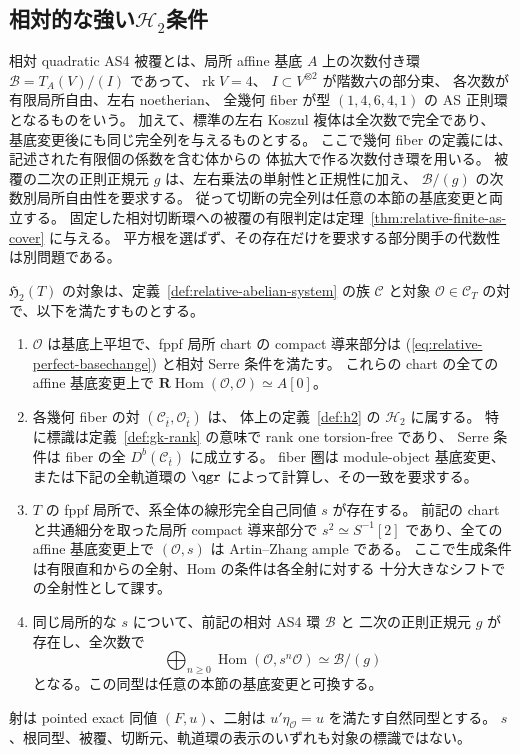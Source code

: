\subsection{相対的な強い\texorpdfstring{$\mathcal H_2$}{H2}条件}

相対 quadratic AS4 被覆とは、局所 affine 基底 $A$ 上の次数付き環
$\mathcal B=T_A(V)/(I)$ であって、$\operatorname{rk}V=4$、
$I\subset V^{\otimes2}$ が階数六の部分束、
各次数が有限局所自由、左右 noetherian、
全幾何 fiber が型 $(1,4,6,4,1)$ の AS 正則環となるものをいう。
加えて、標準の左右 Koszul 複体は全次数で完全であり、
基底変更後にも同じ完全列を与えるものとする。
ここで幾何 fiber の定義には、記述された有限個の係数を含む体からの
体拡大で作る次数付き環を用いる。
被覆の二次の正則正規元 $g$ は、左右乗法の単射性と正規性に加え、
$\mathcal B/(g)$ の次数別局所自由性を要求する。
従って切断の完全列は任意の本節の基底変更と両立する。
固定した相対切断環への被覆の有限判定は定理~\ref{thm:relative-finite-as-cover} に与える。
平方根を選ばず、その存在だけを要求する部分関手の代数性は別問題である。

\begin{definition}
\label{def:relative-h2}
$\mathfrak H_2(T)$ の対象は、定義~\ref{def:relative-abelian-system} の族
$\mathcal C$ と対象 $\mathcal O\in\mathcal C_T$ の対で、以下を満たすものとする。
\begin{enumerate}[label=(RQ\arabic*)]
\item $\mathcal O$ は基底上平坦で、fppf 局所 chart の compact 導来部分は
  (\ref{eq:relative-perfect-basechange}) と相対 Serre 条件を満たす。
  これらの chart の全ての affine 基底変更上で
  $\mathbf R\operatorname{Hom}(\mathcal O,\mathcal O)\simeq A[0]$。
\item 各幾何 fiber の対 $(\mathcal C_{\bar t},\mathcal O_{\bar t})$ は、
  体上の定義~\ref{def:h2} の $\mathcal H_2$ に属する。
  特に標識は定義~\ref{def:gk-rank} の意味で rank one torsion-free であり、
  Serre 条件は fiber の全 $D^b(\mathcal C_{\bar t})$ に成立する。
  fiber 圏は module-object 基底変更、または下記の全軌道環の
  $\qgr$ によって計算し、その一致を要求する。
\item $T$ の fppf 局所で、系全体の線形完全自己同値 $s$ が存在する。
  前記の chart と共通細分を取った局所 compact 導来部分で
  $s^2\simeq S^{-1}[2]$ であり、全ての affine 基底変更上で
  $(\mathcal O,s)$ は Artin--Zhang ample である。
  ここで生成条件は有限直和からの全射、Hom の条件は各全射に対する
  十分大きなシフトでの全射性として課す。
\item 同じ局所的な $s$ について、前記の相対 AS4 環 $\mathcal B$ と
  二次の正則正規元 $g$ が存在し、全次数で
  \[
   \bigoplus_{n\ge0}\operatorname{Hom}(\mathcal O,s^n\mathcal O)
     \simeq\mathcal B/(g)
  \]
  となる。この同型は任意の本節の基底変更と可換する。
\end{enumerate}
射は pointed exact 同値 $(F,u)$、二射は
$u'\eta_{\mathcal O}=u$ を満たす自然同型とする。
$s$、根同型、被覆、切断元、軌道環の表示のいずれも対象の標識ではない。
\end{definition}

